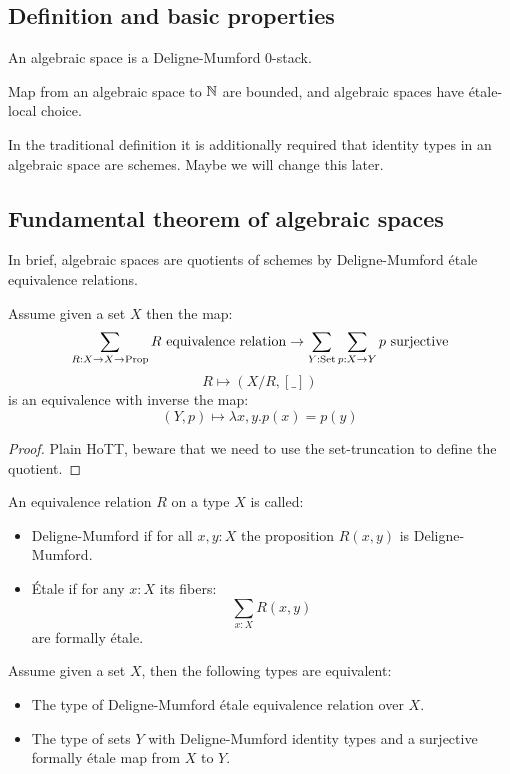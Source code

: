 \subsection{Definition and basic properties}

\begin{definition}
  An algebraic space is a Deligne-Mumford $0$-stack.
\end{definition}

Map from an algebraic space to $\mathbb{N}$ are bounded, and algebraic spaces have étale-local choice.

\begin{remark}
In the traditional definition it is additionally required that identity types in an algebraic space are schemes. Maybe we will change this later.
\end{remark}

\subsection{Fundamental theorem of algebraic spaces}

In brief, algebraic spaces are quotients of schemes by Deligne-Mumford étale equivalence relations.

\begin{lemma}\label{quotient-by-equivalence-relation}
Assume given a set $X$ then the map:
\[ \sum_{R:X\to X\to \Prop} R\ \mathrm{equivalence\ relation} \to \sum_{Y:\mathrm{Set}} \sum_{p:X\to Y} p\ \mathrm{surjective}\]
\[R \mapsto (X/R,[\_])\]
is an equivalence with inverse the map:
\[(Y,p) \mapsto \lambda x,y. p(x)=p(y)\]
\end{lemma}

\begin{proof}
Plain HoTT, beware that we need to use the set-truncation to define the quotient.
\end{proof}

\begin{definition}
An equivalence relation $R$ on a type $X$ is called:
\begin{itemize}
\item Deligne-Mumford if for all $x,y:X$ the proposition $R(x,y)$ is Deligne-Mumford.
\item Étale if for any $x:X$ its fibers:
\[\sum_{x:X} R(x,y)\]
are formally étale.
\end{itemize}
\end{definition}

\begin{proposition}\label{fundamental-propriety-algebraic-spaces}
Assume given a set $X$, then the following types are equivalent:
\begin{itemize}
\item The type of Deligne-Mumford étale equivalence relation over $X$.
\item The type of sets $Y$ with Deligne-Mumford identity types and a surjective formally étale map from $X$ to $Y$.
\end{itemize}
\end{proposition}

